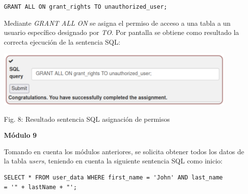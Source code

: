 \documentclass[12pt,oneside,a4paper]{book}
\begin{document}
\begin{enumerate}
\begin{enumerate}
        \vspace{1em}

        \begin{verbatim}
GRANT ALL ON grant_rights TO unauthorized_user;
        \end{verbatim}

        \hspace{20pt}
        Mediante \textit{GRANT ALL ON} se asigna el permiso de acceso a una tabla a un usuario específico designado por \textit{TO}. Por pantalla se obtiene como resultado la correcta ejecución de la sentencia SQL:
        
        \vspace{2em}

        \begin{center}
            \includegraphics[width=12cm]{img/sqli5.png}
            
            \vspace{0.1em}
            
            Fig. 8: Resultado sentencia SQL asignación de permisos
        \end{center}
        
        \vspace{2em}

        \textbf{Módulo 9}
        
        \vspace{1em}

        \hspace{20pt}
        Tomando en cuenta los módulos anteriores, se solicita obtener todos los datos de la tabla \textit{users}, teniendo en cuenta la siguiente sentencia SQL como inicio:

        \vspace{1em}
        
        \begin{verbatim}
SELECT * FROM user_data WHERE first_name = 'John' AND last_name 
= '" + lastName + "';
        \end{verbatim}

        \newpage
        

\end{enumerate}
\end{enumerate}
\end{document}
